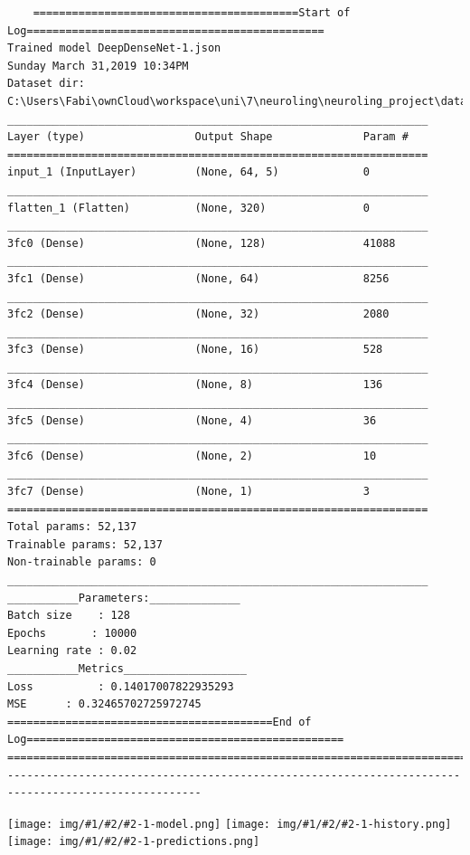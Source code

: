 \documentclass[a4paper]{report}
\newcommand{\net}[3]{
\texttt{[image: img/\#1/\#2/\#2-1-model.png]}
\texttt{[image: img/\#1/\#2/\#2-1-history.png]}
\texttt{[image: img/\#1/\#2/\#2-1-predictions.png]}}
\begin{document}
\begin{lstlisting}
    =========================================Start of Log==============================================
Trained model DeepDenseNet-1.json
Sunday March 31,2019 10:34PM
Dataset dir: C:\Users\Fabi\ownCloud\workspace\uni\7\neuroling\neuroling_project\data\v1
_________________________________________________________________
Layer (type)                 Output Shape              Param #
=================================================================
input_1 (InputLayer)         (None, 64, 5)             0
_________________________________________________________________
flatten_1 (Flatten)          (None, 320)               0
_________________________________________________________________
3fc0 (Dense)                 (None, 128)               41088
_________________________________________________________________
3fc1 (Dense)                 (None, 64)                8256
_________________________________________________________________
3fc2 (Dense)                 (None, 32)                2080
_________________________________________________________________
3fc3 (Dense)                 (None, 16)                528
_________________________________________________________________
3fc4 (Dense)                 (None, 8)                 136
_________________________________________________________________
3fc5 (Dense)                 (None, 4)                 36
_________________________________________________________________
3fc6 (Dense)                 (None, 2)                 10
_________________________________________________________________
3fc7 (Dense)                 (None, 1)                 3
=================================================================
Total params: 52,137
Trainable params: 52,137
Non-trainable params: 0
_________________________________________________________________
___________Parameters:______________
Batch size    : 128
Epochs       : 10000
Learning rate : 0.02
___________Metrics___________________
Loss          : 0.14017007822935293
MSE      : 0.32465702725972745
=========================================End of Log=================================================
====================================================================================================
----------------------------------------------------------------------------------------------------
\end{lstlisting}
\net{5}{DeepDenseNet}{log}
\end{document}
